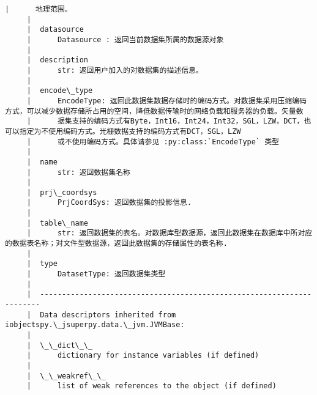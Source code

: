\documentclass[11pt]{article}
\begin{document}
\begin{Verbatim}[commandchars=\\\{\}]
     |      地理范围。
     |  
     |  datasource
     |      Datasource : 返回当前数据集所属的数据源对象
     |  
     |  description
     |      str: 返回用户加入的对数据集的描述信息。
     |  
     |  encode\_type
     |      EncodeType: 返回此数据集数据存储时的编码方式。对数据集采用压缩编码方式，可以减少数据存储所占用的空间，降低数据传输时的网络负载和服务器的负载。矢量数
     |      据集支持的编码方式有Byte，Int16，Int24，Int32，SGL，LZW，DCT，也可以指定为不使用编码方式。光栅数据支持的编码方式有DCT，SGL，LZW
     |      或不使用编码方式。具体请参见 :py:class:`EncodeType` 类型
     |  
     |  name
     |      str: 返回数据集名称
     |  
     |  prj\_coordsys
     |      PrjCoordSys: 返回数据集的投影信息.
     |  
     |  table\_name
     |      str: 返回数据集的表名。对数据库型数据源，返回此数据集在数据库中所对应的数据表名称；对文件型数据源，返回此数据集的存储属性的表名称.
     |  
     |  type
     |      DatasetType: 返回数据集类型
     |  
     |  ----------------------------------------------------------------------
     |  Data descriptors inherited from iobjectspy.\_jsuperpy.data.\_jvm.JVMBase:
     |  
     |  \_\_dict\_\_
     |      dictionary for instance variables (if defined)
     |  
     |  \_\_weakref\_\_
     |      list of weak references to the object (if defined)
    

\end{Verbatim}
\end{document}
